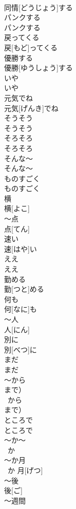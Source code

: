 \documentclass[8pt]{extreport}
\begin{document}
\begin{CJK}{UTF8}{min}
\\	同情[どうじょう]する
\\	パンクする	
\\	パンクする
\\	戻ってくる	
\\	戻[もど]ってくる
\\	優勝する	
\\	優勝[ゆうしょう]する
\\	いや	
\\	いや
\\	元気でね	
\\	元気[げんき]でね
\\	そうそう	
\\	そうそう
\\	そろそろ	
\\	そろそろ
\\	そんな〜	
\\	そんな〜
\\	ものすごく	
\\	ものすごく
\\	横	
\\	横[よこ]
\\	～点	
\\	点[てん]
\\	速い	
\\	速[はや]い
\\	ええ	
\\	ええ
\\	勤める	
\\	勤[つと]める
\\	何も
\\	何[なに]も
\\	～人	
\\	人[にん]
\\	別に 
\\	別[べつ]に
\\	まだ 
\\	まだ
\\	～から　
\\	まで）	
\\	~から　
\\	まで）
\\	ところで	
\\	ところで
\\	～か～	
\\	~か~
\\	～か月	
\\	~か 月[げつ]
\\	～後	
\\	後[ご]
\\	～週間	

\end{CJK}
\end{document}
